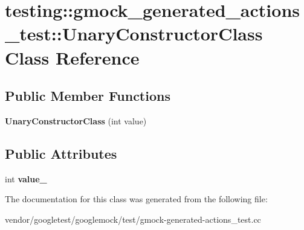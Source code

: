 \hypertarget{classtesting_1_1gmock__generated__actions__test_1_1_unary_constructor_class}{}\section{testing\+:\+:gmock\+\_\+generated\+\_\+actions\+\_\+test\+:\+:Unary\+Constructor\+Class Class Reference}
\label{classtesting_1_1gmock__generated__actions__test_1_1_unary_constructor_class}
\subsection*{Public Member Functions}
\begin{DoxyCompactItemize}
\item 
\mbox{\label{classtesting_1_1gmock__generated__actions__test_1_1_unary_constructor_class_a35b2c0aab3928c1d558c11b6652a7262}} 
{\bfseries Unary\+Constructor\+Class} (int value)
\end{DoxyCompactItemize}
\subsection*{Public Attributes}
\begin{DoxyCompactItemize}
\item 
\mbox{\label{classtesting_1_1gmock__generated__actions__test_1_1_unary_constructor_class_a5e96ce337c5eb7016eba2ea66ae46851}} 
int {\bfseries value\+\_\+}
\end{DoxyCompactItemize}


The documentation for this class was generated from the following file\+:\begin{DoxyCompactItemize}
\item 
vendor/googletest/googlemock/test/gmock-\/generated-\/actions\+\_\+test.\+cc\end{DoxyCompactItemize}
